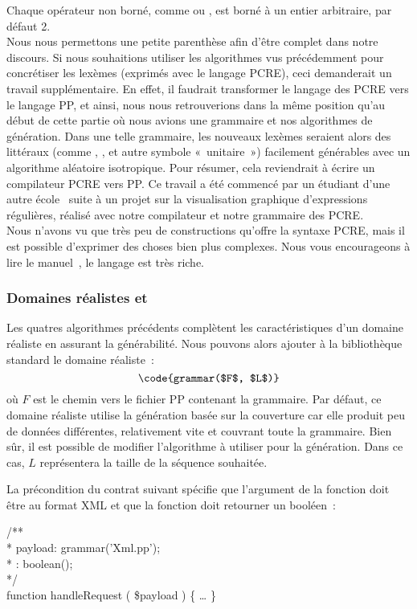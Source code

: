 Chaque opérateur non borné, comme \code{*} ou \code{+}, est borné à un entier
arbitraire, par défaut 2. \\

Nous nous permettons une petite parenthèse afin d'être complet dans notre
discours. Si nous souhaitions utiliser les algorithmes vus précédemment pour
concrétiser les lexèmes (exprimés avec le langage PCRE), ceci demanderait un
travail supplémentaire. En effet, il faudrait transformer le langage des PCRE
vers le langage PP, et ainsi, nous nous retrouverions dans la même position
qu'au début de cette partie où nous avions une grammaire et nos algorithmes de
génération. Dans une telle grammaire, les nouveaux lexèmes seraient alors des
littéraux (comme , ,  et autre symbole «~unitaire~»)
facilement générables avec un algorithme aléatoire isotropique. Pour résumer,
cela reviendrait à écrire un compilateur PCRE vers PP. Ce travail a été commencé
par un étudiant d'une autre école~ suite à un projet sur la
visualisation graphique d'expressions régulières, réalisé avec notre compilateur
et notre grammaire des PCRE. \\

Nous n'avons vu que très peu de constructions qu'offre la syntaxe PCRE, mais il
est possible d'exprimer des choses bien plus complexes. Nous vous encourageons à
lire le manuel~, le langage est très riche.

\subsubsection{Domaines réalistes  et }

Les quatres algorithmes précédents complètent les caractéristiques d'un domaine
réaliste en assurant la générabilité. Nous pouvons alors ajouter à la
bibliothèque standard le domaine réaliste~:
%
$$\code{grammar($F$, $L$)}$$
%
où $F$ est le chemin vers le fichier PP contenant la grammaire. Par défaut, ce
domaine réaliste utilise la génération basée sur la couverture car elle produit
peu de données différentes, relativement vite et couvrant toute la grammaire.
Bien sûr, il est possible de modifier l'algorithme à utiliser pour la
génération. Dans ce cas, $L$ représentera la taille de la séquence souhaitée.

\begin{example}

La précondition du contrat suivant spécifie que l'argument  de
la fonction  doit être au format XML et que la fonction
doit retourner un booléen~:

\begin{pre}
/** \\
 * \arequires payload: grammar('Xml.pp'); \\
 * \aensures  \aresult: boolean(); \\
 */ \\
function handleRequest ( \$payload ) \{ … \}
\end{pre}

\end{example}

